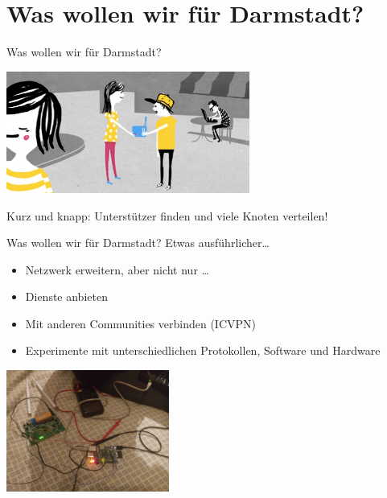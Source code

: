 \documentclass{beamer}
\begin{document}
\section{Was wollen wir für Darmstadt?}
\begin{frame}{Was wollen wir für Darmstadt?}
\begin{center}
\vfill
\includegraphics[width=0.6\textwidth]{images/router}
\end{center}

\vfill
Kurz und knapp: Unterstützer finden und viele Knoten verteilen!
\vfill
\end{frame}


\begin{frame}{Was wollen wir für Darmstadt?}
\vfill
Etwas ausführlicher\ldots
\begin{itemize}
\pause\item Netzwerk erweitern\pause, aber nicht nur \ldots
\pause\item Dienste anbieten
\pause\item Mit anderen Communities verbinden (ICVPN)
\pause\item Experimente mit unterschiedlichen Protokollen, Software und Hardware
\end{itemize}
\begin{center}
\vfill
\includegraphics[width=0.4\textwidth]{images/disassemble}
\end{center}
\vfill
\end{frame}
\end{document}

